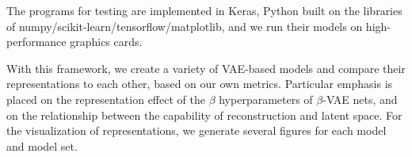 The programs for testing are implemented in Keras, Python built on the libraries of numpy/scikit-learn/tensorflow/matplotlib, and we run their models on high-performance graphics cards.

With this framework, we create a variety of VAE-based models and compare their representations to each other, based on our own metrics. Particular emphasis is placed on the representation effect of the $\beta$ hyperparameters of $\beta$-VAE nets, and on the relationship between the  capability of reconstruction and latent space. For the visualization of representations, we generate several figures for each model and model set.
\vfill


